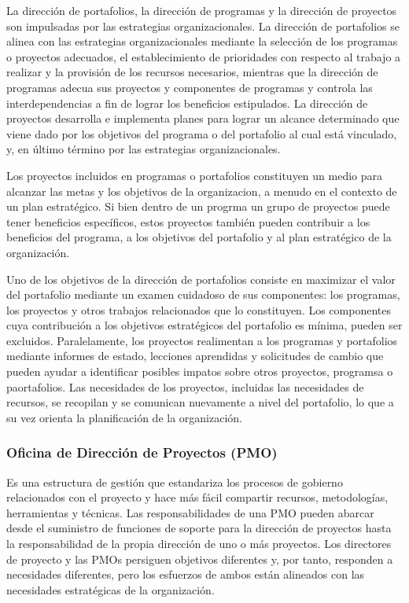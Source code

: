 La dirección de portafolios, la dirección de programas y la dirección de proyectos son impulsadas por las estrategias organizacionales. La dirección de portafolios se alinea con las estrategias organizacionales mediante la selección de los programas o proyectos adecuados, el establecimiento de prioridades con respecto al trabajo a realizar y la provisión de los recursos necesarios, mientras que la dirección de programas adecua sus proyectos y componentes de programas y controla las interdependencias a fin de lograr los beneficios estipulados. La dirección de proyectos desarrolla e implementa planes para lograr un alcance determinado que viene dado por los objetivos del programa o del portafolio al cual está vinculado, y, en último término por las estrategias organizacionales.

Los proyectos incluidos en programas o portafolios constituyen un medio para alcanzar las metas y los objetivos de la organizacion, a menudo en el contexto de un plan estratégico. Si bien dentro de un progrma un grupo de proyectos puede tener beneficios específicos, estos proyectos también pueden contribuir a los beneficios del programa, a los objetivos del portafolio y al plan estratégico de la organización.

Uno de los objetivos de la dirección de portafolios consiste en maximizar el valor del portafolio mediante un examen cuidadoso de sus componentes: los programas, los proyectos y otros trabajos relacionados que lo constituyen. Los componentes cuya contribución a los objetivos estratégicos del portafolio es mínima, pueden ser excluidos. Paralelamente, los proyectos realimentan a los programas y portafolios mediante informes de estado, lecciones aprendidas y solicitudes de cambio que pueden ayudar a identificar posibles impatos sobre otros proyectos, programsa o paortafolios. Las necesidades de los proyectos, incluidas las necesidades de recursos, se recopilan y se comunican nuevamente a nivel del portafolio, lo que a su vez orienta la planificación de la organización.

\subsubsection{Oficina de Dirección de Proyectos (PMO)}

Es una estructura de gestión que estandariza los procesos de gobierno relacionados con el proyecto y hace más fácil compartir recursos, metodologías, herramientas y técnicas. Las responsabilidades de una PMO pueden abarcar desde el suministro de funciones de soporte para la dirección de proyectos hasta la responsabilidad de la propia dirección de uno o más proyectos. Los directores de proyecto y las PMOs persiguen objetivos diferentes y, por tanto, responden a necesidades diferentes, pero los esfuerzos de ambos están alineados con las necesidades estratégicas de la organización.


